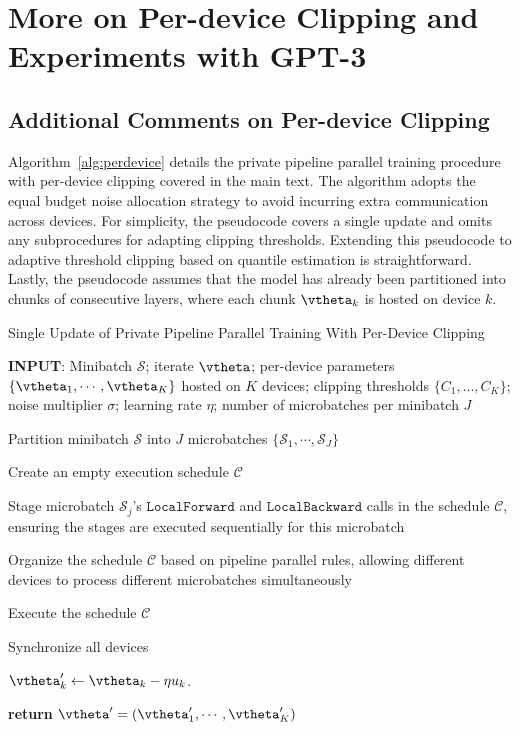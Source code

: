 \newpage
\section{More on Per-device Clipping and Experiments with GPT-3}\label{app:per_device_clipping}

\subsection{Additional Comments on Per-device Clipping}
Algorithm~\ref{alg:perdevice} details the private pipeline parallel training procedure with per-device clipping covered in the main text.
The algorithm adopts the equal budget noise allocation strategy to avoid incurring extra communication across devices.
For simplicity, the pseudocode covers a single update and omits any subprocedures for adapting clipping thresholds. 
Extending this pseudocode to adaptive threshold clipping based on quantile estimation is straightforward. 
Lastly, the pseudocode assumes that the model has already been partitioned into chunks of consecutive layers, where each chunk $\vtheta_k$ is hosted on device $k$. 

\begin{algorithm}
\caption{Single Update of Private Pipeline Parallel Training With Per-Device Clipping}
\label{alg:perdevice}
\begin{algorithmic}[1]

\STATE \textbf{INPUT}:  
Minibatch $\mathcal{S}$; 
iterate $\vtheta$; 
per-device parameters $\{\vtheta_1, \cdots, \vtheta_K\}$ hosted on $K$ devices;  
clipping thresholds $\{C_1,\dots, C_K\}$; 
noise multiplier $\sigma$; 
learning rate $\eta$; 
number of microbatches per minibatch $J$

\STATE Partition minibatch $\mathcal{S}$ into $J$ microbatches $\{ \mathcal{S}_1, \cdots, \mathcal{S}_J \}$

\STATE Create an empty execution schedule $\mathcal{C}$ 


\STATE Stage microbatch $\mathcal{S}_j$'s $\texttt{LocalForward}$ and $\texttt{LocalBackward}$ calls in the schedule $\mathcal{C}$, ensuring the stages are executed sequentially for this microbatch
\ENDFOR

\STATE Organize the schedule $\mathcal{C}$ based on pipeline parallel rules, allowing different devices to process different microbatches simultaneously

\STATE Execute the schedule $\mathcal{C}$

\STATE Synchronize all devices

\STATE $\vtheta_k' \gets \vtheta_k -{\eta} u_k $.
\ENDFOR

\STATE \textbf{return} $\vtheta' = (\vtheta_1', \cdots, \vtheta_K') $
\end{algorithmic}
\end{algorithm}


